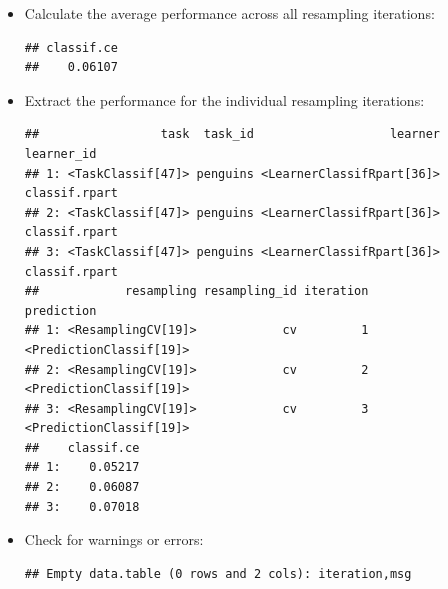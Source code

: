 \documentclass[
]{scrbook}
\newenvironment{Shaded}{\begin{snugshade}}{\end{snugshade}}
\newcommand{\FunctionTok}[1]{\textcolor[rgb]{0.00,0.00,0.00}{#1}}
\newcommand{\NormalTok}[1]{#1}
\newcommand{\SpecialCharTok}[1]{\textcolor[rgb]{0.00,0.00,0.00}{#1}}
\newcommand{\StringTok}[1]{\textcolor[rgb]{0.31,0.60,0.02}{#1}}
\renewenvironment{Shaded} {\begin{snugshade}\small} {\end{snugshade}}
\begin{document}
\begin{itemize}
\item
  Calculate the average performance across all resampling iterations:

\begin{Shaded}
\end{Shaded}

\begin{verbatim}
## classif.ce 
##    0.06107
\end{verbatim}
\item
  Extract the performance for the individual resampling iterations:

\begin{Shaded}
\end{Shaded}

\begin{verbatim}
##                 task  task_id                   learner    learner_id
## 1: <TaskClassif[47]> penguins <LearnerClassifRpart[36]> classif.rpart
## 2: <TaskClassif[47]> penguins <LearnerClassifRpart[36]> classif.rpart
## 3: <TaskClassif[47]> penguins <LearnerClassifRpart[36]> classif.rpart
##            resampling resampling_id iteration              prediction
## 1: <ResamplingCV[19]>            cv         1 <PredictionClassif[19]>
## 2: <ResamplingCV[19]>            cv         2 <PredictionClassif[19]>
## 3: <ResamplingCV[19]>            cv         3 <PredictionClassif[19]>
##    classif.ce
## 1:    0.05217
## 2:    0.06087
## 3:    0.07018
\end{verbatim}
\item
  Check for warnings or errors:

\begin{Shaded}
\end{Shaded}

\begin{verbatim}
## Empty data.table (0 rows and 2 cols): iteration,msg
\end{verbatim}


\end{itemize}
\end{document}
